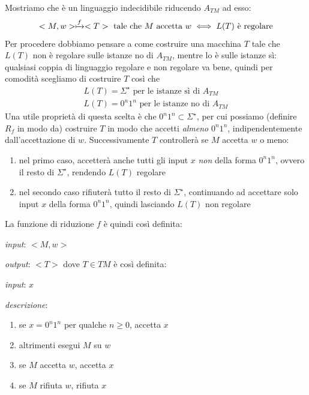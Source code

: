 Mostriamo che è un linguaggio indecidibile riducendo $A_{TM}$ ad esso:
\[
	<M, w> \xmapsto{f} <T> \text{ tale che } M \text{ accetta } w \iff L(T) \text{ è regolare}
\]
Per procedere dobbiamo pensare a come costruire una macchina $T$ tale che $L(T)$ non è regolare sulle istanze no di $A_{TM}$, mentre lo è sulle istanze sì: qualsiasi coppia di linguaggio regolare e non regolare va bene, quindi per comodità scegliamo di costruire $T$ così che 
\begin{gather*}
L(T) = \Sigma^{\star} \text{ per le istanze sì di } A_{TM}\\
L(T) = 0^n1^n \text{ per le istanze no di } A_{TM}
\end{gather*}
Una utile proprietà di questa scelta è che $0^n1^n \subset \Sigma^{\star}$, per cui possiamo (definire $R_f$ in modo da) costruire $T$ in modo che accetti \textit{almeno} $0^n1^n$, indipendentemente dall'accettazione di $w$. Successivamente $T$ controllerà se $M$ accetta $w$ o meno: 
\begin{enumerate}
\item nel primo caso, accetterà anche tutti gli input $x$ \textit{non} della forma $0^n1^n$, ovvero il resto di $\Sigma^{\star}$, rendendo $L(T)$ regolare

\item nel secondo caso rifiuterà tutto il resto di $\Sigma^{\star}$, continuando ad accettare solo input $x$ della forma $0^n1^n$, quindi lasciando $L(T)$ non regolare
\end{enumerate} 

La funzione di riduzione $f$ è quindi così definita:
\begin{description}
\item \textit{input}: $<M, w>$
\item \textit{output}: $<T>$ dove $T \in TM$ è così definita:
\begin{description}
\item \textit{input}: $x$
\item \textit{descrizione}:
\begin{enumerate}
\item se $x = 0^n1^n$ per qualche $n \geq 0$, accetta $x$
\item altrimenti esegui $M$ su $w$
\item se $M$ accetta $w$, accetta $x$
\item se $M$ rifiuta $w$, rifiuta $x$

\end{enumerate}
\end{description}
\end{description}


